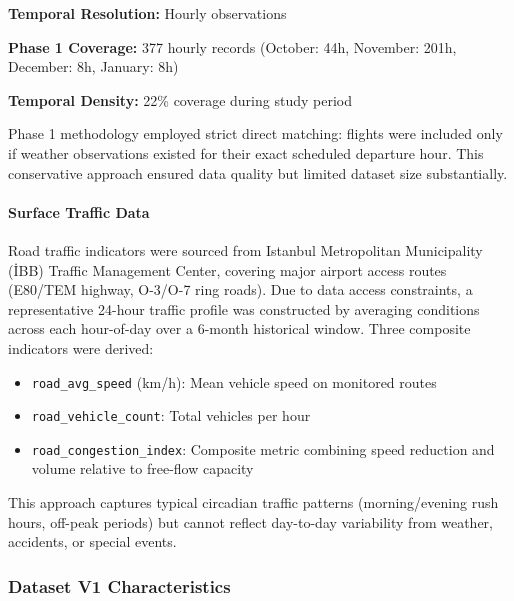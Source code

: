 \documentclass{report}
\begin{document}
\textbf{Temporal Resolution:} Hourly observations

\textbf{Phase 1 Coverage:} 377 hourly records (October: 44h, November: 201h, December: 8h, January: 8h)

\textbf{Temporal Density:} 22\% coverage during study period

Phase 1 methodology employed strict direct matching: flights were included only if weather observations existed for their exact scheduled departure hour. This conservative approach ensured data quality but limited dataset size substantially.

\paragraph{Surface Traffic Data}

Road traffic indicators were sourced from Istanbul Metropolitan Municipality (İBB) Traffic Management Center, covering major airport access routes (E80/TEM highway, O-3/O-7 ring roads). Due to data access constraints, a representative 24-hour traffic profile was constructed by averaging conditions across each hour-of-day over a 6-month historical window. Three composite indicators were derived:

\begin{itemize}
    \item \texttt{road\_avg\_speed} (km/h): Mean vehicle speed on monitored routes
    \item \texttt{road\_vehicle\_count}: Total vehicles per hour
    \item \texttt{road\_congestion\_index}: Composite metric combining speed reduction and volume relative to free-flow capacity
\end{itemize}

This approach captures typical circadian traffic patterns (morning/evening rush hours, off-peak periods) but cannot reflect day-to-day variability from weather, accidents, or special events.

\subsubsection{Dataset V1 Characteristics}
\end{document}
